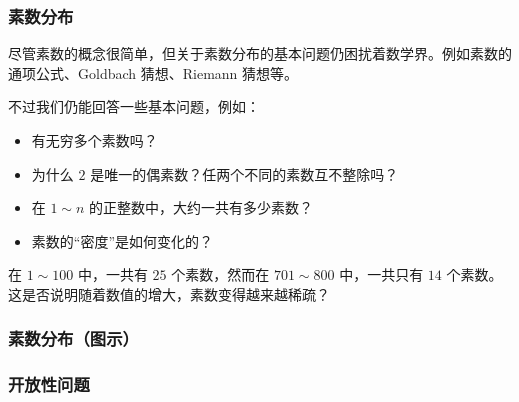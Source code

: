 \begin{frame}
  \frametitle{素数分布}
  尽管素数的概念很简单，但关于素数分布的基本问题仍困扰着数学界。例如素数的通项公式、Goldbach 猜想、Riemann 猜想等。
  \pause
  
  \emptyline
  不过我们仍能回答一些基本问题，例如：
  \begin{itemize}
    \item 有无穷多个素数吗？
    \item 为什么 $2$ 是唯一的偶素数？任两个不同的素数互不整除吗？
    \item 在 $1 \sim n$ 的正整数中，大约一共有多少素数？
    \item 素数的“密度”是如何变化的？
  \end{itemize}
  \pause
  在 $1 \sim 100$ 中，一共有 $25$ 个素数，然而在 $701 \sim 800$ 中，一共只有 $14$ 个素数。这是否说明随着数值的增大，素数变得越来越稀疏？
\end{frame}
\begin{frame}
  \frametitle{素数分布（图示）}
\end{frame}
\begin{frame}
  \frametitle{开放性问题}
\end{frame}
